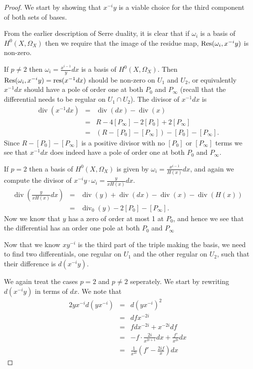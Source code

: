 \documentclass[draft, 11pt]{article} %
\theoremstyle{plain}
\theoremstyle{remark}
\DeclareMathOperator{\di}{div}
\begin{document}
\begin{proof}

We start by showing that $x^{-i}y$ is a viable choice for the third component of both sets of bases.

From the earlier description of Serre duality, it is clear that if $\omega_i$ is a basis of $H^0(X, \Omega_X)$ then we require that the image of the residue map, ${\rm Res}(\omega_i, x^{-i}y)$ is non-zero.

If $p \neq 2$ then $\omega_i = \frac{x^{i-1}}{y}dx$ is a basis of $H^0(X, \Omega_X)$. 
Then ${\rm Res}(\omega_i, x^{-i}y) = {\rm res}(x^{-1}dx)$ should be non-zero on $U_1$ and $U_2$, or equivalently $x^{-1}dx$ should have a pole of order one at both $P_0$ and $P_\infty$ (recall that the differential needs to be regular on $U_1 \cap U_2$).
The divisor of $x^{-1}dx$ is
\begin{eqnarray}
\di (x^{-1}dx) & = & \di(dx) - \di (x) \\
& = & R - 4[P_\infty] - 2[P_0] + 2[P_\infty] \\
& = & (R-[P_0]-[P_\infty]) - [P_0] - [P_\infty].
\end{eqnarray}
Since $R -[P_0]-[P_\infty]$ is a positive divisor with no $[P_0]$ or $[P_\infty]$ terms we see that $x^{-1}dx$ does indeed have a pole of order one at both $P_0$ and $P_\infty$.

If $p=2$ then a basis of $H^0(X,\Omega_X)$ is given by $\omega_i = \frac{x^{i-1}}{H(x)}dx$, and again we compute the divisor of $x^{-i}y\cdot \omega_i = \frac{y}{xH(x)}dx$.
\begin{eqnarray}
\di\left( \frac{y}{xH(x)}dx \right) & = & \di(y) + \di(dx) - \di(x) - \di(H(x)) \\
& = & \di_0(y) -2[P_0] -[P_\infty].
\end{eqnarray}
Now we know that $y$ has a zero of order at most 1 at $P_0$, and hence we see that the differential has an order one pole at both $P_0$ and $P_\infty$ 

Now that we know $xy^{-i}$ is the third part of the triple making the basis, we need to find two differentials, one regular on $U_1$ and the other regular on $U_2$, such that their difference is $d(x^{-i}y)$.

We again treat the cases $p=2$ and $p\neq 2$ seperately.
We start by rewriting $d(x^{-i}y)$ in terms of $dx$.
We note that
\begin{eqnarray*}
2yx^{-i}d(yx^{-i}) & = & d(yx^{-i})^2 \\
& = & dfx^{-2i} \\
& = & fdx^{-2i} + x^{-2i}df \\
& = & -f\cdot\frac{2i}{x^{2i+1}}dx + \frac{f'}{x^{2i}}dx \\
& = & \frac{1}{x^{2i}}\left( f' - \frac{2if}{x}\right) dx 
\end{eqnarray*}


\end{proof}
\end{document}
